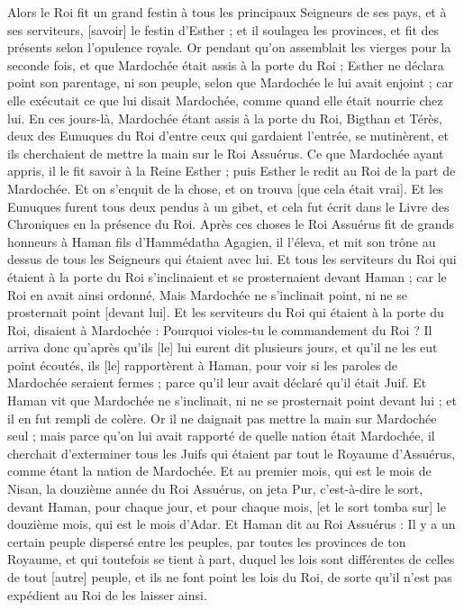\begin{multicols}{2}
Alors le Roi fit un grand festin à tous les principaux Seigneurs de ses pays, et à ses serviteurs, [savoir] le festin d'Esther ; et il soulagea les provinces, et fit des présents selon l'opulence royale.
Or pendant qu'on assemblait les vierges pour la seconde fois, et que Mardochée était assis à la porte du Roi ;
Esther ne déclara point son parentage, ni son peuple, selon que Mardochée le lui avait enjoint ; car elle exécutait ce que lui disait Mardochée, comme quand elle était nourrie chez lui.
En ces jours-là, Mardochée étant assis à la porte du Roi, Bigthan et Térès, deux des Eunuques du Roi d'entre ceux qui gardaient l'entrée, se mutinèrent, et ils cherchaient de mettre la main sur le Roi Assuérus.
Ce que Mardochée ayant appris, il le fit savoir à la Reine Esther ; puis Esther le redit au Roi de la part de Mardochée.
Et on s'enquit de la chose, et on trouva [que cela était vrai]. Et les Eunuques furent tous deux pendus à un gibet, et cela fut écrit dans le Livre des Chroniques en la présence du Roi.
\VerseOne{}Après ces choses le Roi Assuérus fit de grands honneurs à Haman fils d'Hammédatha Agagien, il l'éleva, et mit son trône au dessus de tous les Seigneurs qui étaient avec lui.
Et tous les serviteurs du Roi qui étaient à la porte du Roi s'inclinaient et se prosternaient devant Haman ; car le Roi en avait ainsi ordonné. Mais Mardochée ne s'inclinait point, ni ne se prosternait point [devant lui].
Et les serviteurs du Roi qui étaient à la porte du Roi, disaient à Mardochée : Pourquoi violes-tu le commandement du Roi ?
Il arriva donc qu'après qu'ils [le] lui eurent dit plusieurs jours, et qu'il ne les eut point écoutés, ils [le] rapportèrent à Haman, pour voir si les paroles de Mardochée seraient fermes ; parce qu'il leur avait déclaré qu'il était Juif.
Et Haman vit que Mardochée ne s'inclinait, ni ne se prosternait point devant lui ; et il en fut rempli de colère.
Or il ne daignait pas mettre la main sur Mardochée seul ; mais parce qu'on lui avait rapporté de quelle nation était Mardochée, il cherchait d'exterminer tous les Juifs qui étaient par tout le Royaume d'Assuérus, comme étant la nation de Mardochée.
Et au premier mois, qui est le mois de Nisan, la douzième année du Roi Assuérus, on jeta Pur, c'est-à-dire le sort, devant Haman, pour chaque jour, et pour chaque mois, [et le sort tomba sur] le douzième mois, qui est le mois d'Adar.
Et Haman dit au Roi Assuérus : Il y a un certain peuple dispersé entre les peuples, par toutes les provinces de ton Royaume, et qui toutefois se tient à part, duquel les lois sont différentes de celles de tout [autre] peuple, et ils ne font point les lois du Roi, de sorte qu'il n'est pas expédient au Roi de les laisser ainsi.

\end{multicols}
